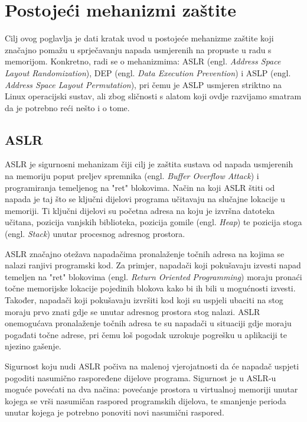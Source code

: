 \documentclass[times, utf8, diplomski, numeric]{fer}
\begin{document}
\chapter{Postojeći mehanizmi zaštite}

Cilj ovog poglavlja je dati kratak uvod u postojeće mehanizme
zaštite koji značajno pomažu u sprječavanju napada usmjerenih na
propuste u radu s memorijom. Konkretno, radi se o mehanizmima: ASLR (engl. 
\emph{Address Space Layout Randomization}), DEP (engl. \emph{Data
Execution Prevention}) i ASLP (engl. \emph{Address Space Layout
Permutation}), pri čemu je ASLP usmjeren striktno na Linux
operacijski sustav, ali zbog sličnosti s alatom koji ovdje
razvijamo smatram da je potrebno reći nešto i o tome. 

\section{ASLR}
\label{sct:aslr}

ASLR je sigurnosni mehanizam čiji cilj je zaštita sustava od
napada usmjerenih na memoriju poput preljev spremnika (engl. 
\emph{Buffer Overflow Attack}) i programiranja temeljenog na
"ret" blokovima. Način na koji ASLR štiti od napada je taj što se
ključni dijelovi programa učitavaju na slučajne lokacije u
memoriji. Ti ključni dijelovi su početna adresa na koju je
izvršna datoteka učitana, pozicija vanjskih biblioteka, pozicija
gomile (engl. \emph{Heap}) te pozicija stoga (engl. \emph{Stack}) 
unutar procesnog adresnog prostora.

ASLR značajno otežava napadačima pronalaženje točnih adresa na
kojima se nalazi ranjivi programski kod. Za primjer, napadači
koji pokušavaju izvesti napad temeljen na "ret" blokovima 
(engl. \emph{Return Oriented Programming}) \citep{rop_official} 
moraju pronaći točne memorijske lokacije pojedinih blokova kako
bi ih bili u mogućnosti izvesti. Također, napadači koji
pokušavaju izvršiti kod koji su uspjeli ubaciti na stog moraju
prvo znati gdje se unutar adresnog prostora stog nalazi. ASLR
onemogućava pronalaženje točnih adresa te su napadači u situaciji
gdje moraju pogađati točne adrese, pri čemu loš pogodak uzrokuje
pogrešku u aplikaciji te njezino gašenje.

Sigurnost koju nudi ASLR počiva na malenoj vjerojatnosti da će
napadač uspjeti pogoditi nasumično raspoređene dijelove programa.
Sigurnost je u ASLR-u moguće povećati na dva načina: povećanje
prostora u virtualnoj memoriji unutar kojega se vrši nasumičan
raspored programskih dijelova, te smanjenje perioda unutar kojega
je potrebno ponoviti novi nasumični raspored. 
\end{document}

